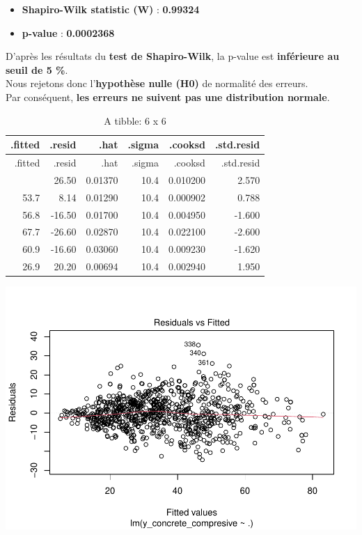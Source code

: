 \documentclass[
  12pt,
]{article}
\providecommand{\tightlist}{%
  \setlength{\itemsep}{0pt}\setlength{\parskip}{0pt}}
\begin{document}
\begin{itemize}
\tightlist
\item
  \textbf{Shapiro-Wilk statistic (W)} : \textbf{0.99324}\\
\item
  \textbf{p-value} : \textbf{0.0002368}
\end{itemize}

D'après les résultats du \textbf{test de Shapiro-Wilk}, la p-value est
\textbf{inférieure au seuil de 5 \%}.\\
Nous rejetons donc l'\textbf{hypothèse nulle (H0)} de normalité des
erreurs.\\
Par conséquent, \textbf{les erreurs ne suivent pas une distribution
normale}.

\begin{longtable}[]{@{}rrrrrr@{}}
\caption{A tibble: 6 x 6}\tabularnewline
\toprule\noalign{}
.fitted & .resid & .hat & .sigma & .cooksd & .std.resid \\
\midrule\noalign{}
\endfirsthead
\toprule\noalign{}
.fitted & .resid & .hat & .sigma & .cooksd & .std.resid \\
\midrule\noalign{}
\endhead
\bottomrule\noalign{}
\endlastfoot
53.5 & 26.50 & 0.01370 & 10.4 & 0.010200 & 2.570 \\
53.7 & 8.14 & 0.01290 & 10.4 & 0.000902 & 0.788 \\
56.8 & -16.50 & 0.01700 & 10.4 & 0.004950 & -1.600 \\
67.7 & -26.60 & 0.02870 & 10.4 & 0.022100 & -2.600 \\
60.9 & -16.60 & 0.03060 & 10.4 & 0.009230 & -1.620 \\
26.9 & 20.20 & 0.00694 & 10.4 & 0.002940 & 1.950 \\
\end{longtable}

\includegraphics{rmd_final_files/figure-latex/unnamed-chunk-18-1.pdf}
\end{document}
